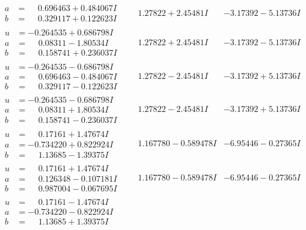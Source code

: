 \documentclass[1p]{elsarticle_modified}
\theoremstyle{definition}
\begin{document}
$$\begin{array}{c|c|c}
\begin{aligned}
a &= \phantom{-}0.696463 + 0.484067 I \\
b &= \phantom{-}0.329117 + 0.122623 I\end{aligned}
 & \phantom{-}1.27822 + 2.45481 I & -3.17392 - 5.13736 I \\ \hline\begin{aligned}
u &= -0.264535 + 0.686798 I \\
a &= \phantom{-}0.08311 - 1.80534 I \\
b &= \phantom{-}0.158741 + 0.236037 I\end{aligned}
 & \phantom{-}1.27822 + 2.45481 I & -3.17392 - 5.13736 I \\ \hline\begin{aligned}
u &= -0.264535 - 0.686798 I \\
a &= \phantom{-}0.696463 - 0.484067 I \\
b &= \phantom{-}0.329117 - 0.122623 I\end{aligned}
 & \phantom{-}1.27822 - 2.45481 I & -3.17392 + 5.13736 I \\ \hline\begin{aligned}
u &= -0.264535 - 0.686798 I \\
a &= \phantom{-}0.08311 + 1.80534 I \\
b &= \phantom{-}0.158741 - 0.236037 I\end{aligned}
 & \phantom{-}1.27822 - 2.45481 I & -3.17392 + 5.13736 I \\ \hline\begin{aligned}
u &= \phantom{-}0.17161 + 1.47674 I \\
a &= -0.734220 + 0.822924 I \\
b &= \phantom{-}1.13685 - 1.39375 I\end{aligned}
 & \phantom{-}1.167780 - 0.589478 I & -6.95446 - 0.27365 I \\ \hline\begin{aligned}
u &= \phantom{-}0.17161 + 1.47674 I \\
a &= \phantom{-}0.126348 - 0.107181 I \\
b &= \phantom{-}0.987004 - 0.067695 I\end{aligned}
 & \phantom{-}1.167780 - 0.589478 I & -6.95446 - 0.27365 I \\ \hline\begin{aligned}
u &= \phantom{-}0.17161 - 1.47674 I \\
a &= -0.734220 - 0.822924 I \\
b &= \phantom{-}1.13685 + 1.39375 I\end{aligned}

\end{array}$$
\end{document}
